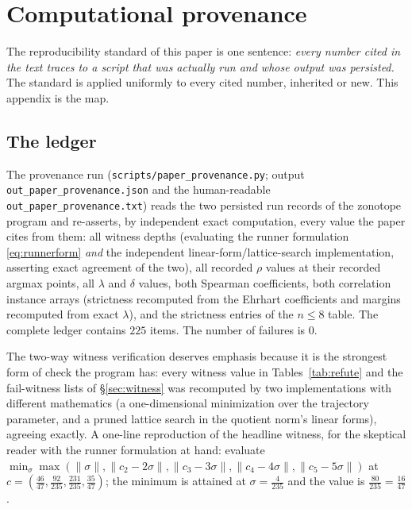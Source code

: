 \documentclass[11pt,a4paper]{article}
\numberwithin{equation}{section}
\theoremstyle{plain}
\theoremstyle{definition}
\theoremstyle{remark}
\newcommand{\wnc}[1]{\lVert #1 \rVert}
\begin{document}

\section{Computational provenance}\label{sec:prov}

The reproducibility standard of this paper is one sentence:
\emph{every number cited in the text traces to a script that was
actually run and whose output was persisted.} The standard is applied
uniformly to every cited number, inherited or new. This appendix is
the map.

\subsection{The ledger}

The provenance run (\texttt{scripts/paper\_provenance.py}; output
\texttt{out\_paper\_provenance.json} and the human-readable
\texttt{out\_paper\_provenance.txt}) reads the two persisted run records
of the zonotope program and re-asserts, by independent exact
computation, every value the paper cites from them: all witness depths
(evaluating the runner formulation \eqref{eq:runnerform} \emph{and} the
independent linear-form/lattice-search implementation, asserting exact
agreement of the two), all recorded $\rho$ values at their recorded
argmax points, all $\lambda$ and $\delta$ values, both Spearman
coefficients, both correlation instance arrays (strictness recomputed
from the Ehrhart coefficients and margins recomputed from exact
$\lambda$), and the strictness entries of the $n\le8$ table. The
complete ledger contains $225$ items. The number of failures is $0$.

The two-way witness verification deserves emphasis because it is the
strongest form of check the program has: every witness value in
Tables~\ref{tab:refute} and the fail-witness lists of
\S\ref{sec:witness} was recomputed by two implementations with different
mathematics (a one-dimensional minimization over the trajectory
parameter, and a pruned lattice search in the quotient norm's linear
forms), agreeing exactly. A one-line reproduction of the headline
witness, for the skeptical reader with the runner formulation at
hand: evaluate
$\min_\sigma\max(\wnc\sigma,\wnc{c_2-2\sigma},\wnc{c_3-3\sigma},
\wnc{c_4-4\sigma},\wnc{c_5-5\sigma})$ at
$c=(\tfrac{46}{47},\tfrac{92}{235},\tfrac{231}{235},\tfrac{35}{47})$;
the minimum is attained at $\sigma=\tfrac{4}{235}$ and the value is
$\tfrac{80}{235}=\tfrac{16}{47}$.
\end{document}
